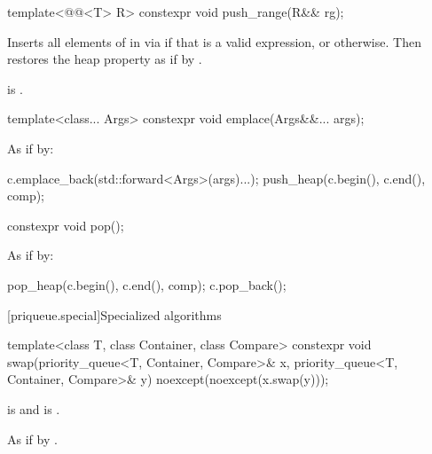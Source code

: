 %
\begin{itemdecl}
template<@@<T> R>
  constexpr void push_range(R&& rg);
\end{itemdecl}

\begin{itemdescr}
\pnum
\effects
Inserts all elements of  in  via
 if that is a valid expression, or
 otherwise.
Then restores the heap property as if by
.

\pnum
\ensures
{} is .
\end{itemdescr}

%
\begin{itemdecl}
template<class... Args> constexpr void emplace(Args&&... args);
\end{itemdecl}

\begin{itemdescr}
\pnum
\effects
As if by:
\begin{codeblock}
c.emplace_back(std::forward<Args>(args)...);
push_heap(c.begin(), c.end(), comp);
\end{codeblock}
\end{itemdescr}

%
\begin{itemdecl}
constexpr void pop();
\end{itemdecl}

\begin{itemdescr}
\pnum
\effects
As if by:
\begin{codeblock}
pop_heap(c.begin(), c.end(), comp);
c.pop_back();
\end{codeblock}
\end{itemdescr}

[priqueue.special]{Specialized algorithms}

%
\begin{itemdecl}
template<class T, class Container, class Compare>
  constexpr void swap(priority_queue<T, Container, Compare>& x,
                      priority_queue<T, Container, Compare>& y) noexcept(noexcept(x.swap(y)));
\end{itemdecl}

\begin{itemdescr}
\pnum
\constraints
{} is  and
 is .

\pnum
\effects
As if by .
\end{itemdescr}

